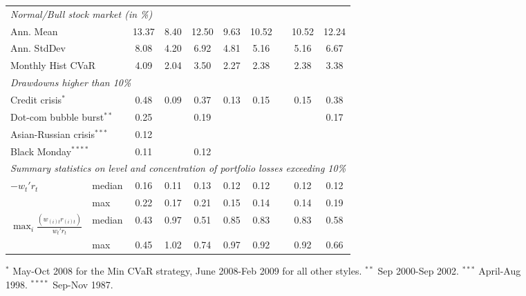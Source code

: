 \documentclass[11pt]{article}
\begin{document}
\begin{figure}[tb]
{\begin{tabular}{|lc c cccc c cc| }
 \multicolumn{10}{|l|}{\emph{Normal/Bull stock market (in \%)}} \\
 \multicolumn{2}{|l}{Ann. Mean  } 	         &           13.37	    	    & 8.40	      & 12.50	        & 9.63	 & 10.52         & & 10.52  & 12.24      \\
 \multicolumn{2}{|l}{Ann. StdDev }       &   8.08    & 4.20	      & 6.92	        & 4.81   & 5.16          & & 5.16  & 6.67     \\
 \multicolumn{2}{|l}{Monthly Hist  CVaR}   &	        4.09                & 2.04        &	3.50            & 2.27   & 2.38         & & 2.38  & 3.38   \\
 \hline \multicolumn{10}{|l|}{ \emph{Drawdowns higher than 10\%}  }  \\
 \multicolumn{2}{|l}{Credit crisis$^{*}$}       &             0.48                & 0.09    	 & 0.37	           &0.13    & 0.15  	       & & 0.15 & 0.38            \\
 \multicolumn{2}{|l}{Dot-com bubble burst$^{**}$}&            0.25               &	        & 0.19             &	    &               & &       & 0.17              \\
 \multicolumn{2}{|l}{Asian-Russian crisis$^{***}$}&        0.12              &           &	               &	    &              & &      &      \\         \multicolumn{2}{|l}{ Black Monday$^{****}$}	    &            0.11            &              & 0.12	      	   &	   &          &       &          &
 \\	
 \hline \multicolumn{10}{|l|}{ \emph{Summary statistics on level and concentration of portfolio losses exceeding 10\%}  }  \\
$-w_t'r_t$ & \multicolumn{1}{l}{ median}   &        0.16             &  0.11      & 0.13             &0.12	    &  0.12        & & 0.12 & 0.12      \\
 &\multicolumn{1}{l}{  max  }    &        0.22             & 0.17    	& 0.21	           &0.15    & 0.14  	       & & 0.14 & 0.19            \\
$\max_i\frac{(w_{(i)t}r_{(i)t})}{w_t'r_t}$  & \multicolumn{1}{l}{ median}   &        0.43          &0.97	        & 0.51             &	 0.85   &   0.83            & & 0.83      & 0.58    \\
         & \multicolumn{1}{l}{ max  }    &        0.45          & 1.02    	 & 0.74	           &0.97    & 0.92  	       & & 0.92 & 0.66            \\  \hline
\end{tabular}
}
{\scriptsize $^{*}$ May-Oct 2008 for the Min CVaR strategy,  June 2008-Feb 2009 for all other styles. $^{**}$ Sep 2000-Sep 2002.
\newline $^{***}$ April-Aug 1998. $^{****}$ Sep-Nov 1987. }
\end{figure}
\end{document}
